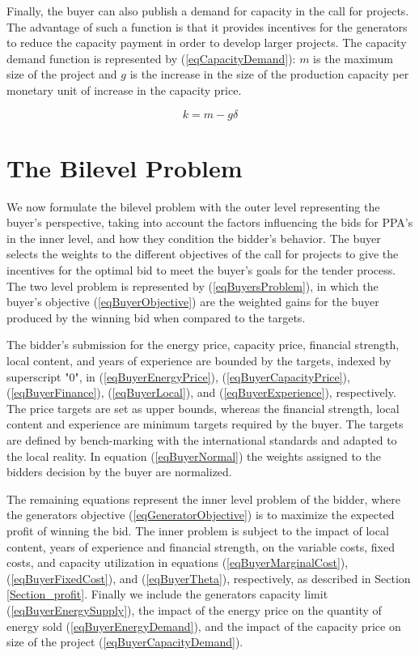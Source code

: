 \documentclass[informs]{informs3}
\begin{document}
Finally, the buyer can also publish a demand for capacity in the call for projects. The advantage of such a function is that it provides incentives for the generators to reduce the capacity payment in order to develop larger projects. The capacity demand function is represented by (\ref{eqCapacityDemand}): $m$ is the maximum size of the project and $g$ is the increase in the size of the production capacity per monetary unit of increase in the capacity price.


\begin{equation} \label{eqCapacityDemand}
k = m -g \delta
\end{equation}

\section{The Bilevel Problem}\label{Section_problem}

We now formulate the bilevel problem with the outer level representing the  buyer's perspective, taking into account the factors influencing the bids for PPA's in the inner level, and how they condition the bidder’s behavior. The buyer selects the weights to the different objectives of the call for projects to give the incentives for the optimal bid to meet the buyer’s goals for the tender process. The two level problem is represented by (\ref{eqBuyersProblem}), in which the buyer’s objective (\ref{eqBuyerObjective}) are the weighted gains for the buyer produced by the winning bid when compared to the targets. 

The bidder's submission for the energy price, capacity price, financial strength, local content, and years of experience are bounded by the targets, indexed by superscript "0", in (\ref{eqBuyerEnergyPrice}), (\ref{eqBuyerCapacityPrice}), (\ref{eqBuyerFinance}), (\ref{eqBuyerLocal}), and (\ref{eqBuyerExperience}), respectively. The price targets are set as upper bounds, whereas the financial strength, local content and experience are minimum targets required by the buyer. The targets are defined by bench-marking with the international standards and adapted to the local reality. In equation (\ref{eqBuyerNormal}) the weights assigned to the bidders decision by the buyer are normalized.

The remaining equations represent the inner level problem of the bidder, where the generators objective (\ref{eqGeneratorObjective})  is to maximize the expected profit of winning the bid. The inner problem is subject to the impact of local content, years of experience and financial strength, on the variable costs, fixed costs, and capacity utilization in equations (\ref{eqBuyerMarginalCost}), (\ref{eqBuyerFixedCost}), and (\ref{eqBuyerTheta}), respectively, as described in Section \ref{Section_profit}. Finally we include the generators capacity limit (\ref{eqBuyerEnergySupply}), the impact of the energy price on the quantity of energy sold (\ref{eqBuyerEnergyDemand}), and the impact of the capacity price on size of the project  (\ref{eqBuyerCapacityDemand}).
\end{document}
